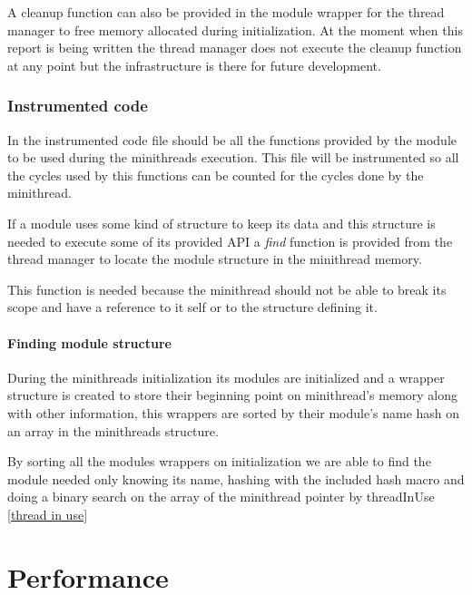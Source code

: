\documentclass[12pt,a4paper]{report}
\begin{document}
A cleanup function can also be provided in the module wrapper for the thread manager to free memory allocated during initialization. At the moment when this report is being written the thread manager does not execute the cleanup function at any point but the infrastructure is there for future development.  

\subsection{Instrumented code}
In the instrumented code file should be all the functions provided by the module to be used during the minithreads execution. This file will be instrumented so all the cycles used by this functions can be counted for the cycles done by the minithread. 

If a module uses some kind of structure to keep its data and this structure is needed to execute some of its provided API a \textit{find} function is provided from the thread manager to locate the module structure in the minithread memory.  

This function is needed because the minithread should not be able to break its scope and have a reference to it self or to the structure defining it. 

\subsubsection{Finding module structure}
During the minithreads initialization its modules are initialized and a wrapper structure is created to store their beginning point on minithread's memory along with other information, this wrappers are sorted by their module's name hash on an array in the minithreads structure.

By sorting all the modules wrappers on initialization we are able to find the module needed only knowing its name, hashing with the included hash macro and doing a binary search on the array of the minithread pointer by threadInUse \ref{thread in use}


\fi
\clearpage
\clearpage
\chapter{Performance}
\end{document}
